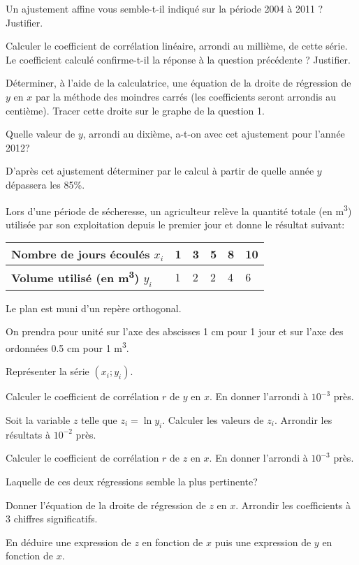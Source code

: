 \documentclass[a4paper,12pt]{scrartcl}
\begin{document}

\subquestion{}
Un ajustement affine vous semble-t-il indiqué sur la période 2004 à 2011 ? Justifier.

\subquestion{}
Calculer le coefficient de corrélation linéaire, arrondi au millième, de cette série.
Le coefficient calculé confirme-t-il la réponse à la question précédente ? Justifier.


Déterminer, à l’aide de la calculatrice, une équation de la droite de régression de $y$ en $x$ par la méthode des moindres carrés (les coefficients seront arrondis au centième). Tracer cette droite sur le graphe de la question 1. %

\question{}
Quelle valeur de $y$, arrondi au dixième, a-t-on avec cet ajustement pour l'année 2012?

\question{}
D'après cet ajustement déterminer par le calcul à partir de quelle année $y$ dépassera les 85\%.



Lors d'une période de sécheresse, un agriculteur relève la quantité totale (en m\textsuperscript{3}) utilisée par son exploitation depuis le premier jour et donne le résultat suivant:

\begin{center}
\begin{tabular}{|l|l|l|l|l|l|}
\hline
\textbf{Nombre de jours écoulés $x_i$} & 1 & 3 & 5 & 8 & 10\\ \hline
\textbf{Volume utilisé (en m\textsuperscript{3}) $y_i$} & 1 & 2 & 2 & 4 & 6 \\ \hline
\end{tabular}
\end{center}

Le plan est muni d'un repère orthogonal.

On prendra pour unité sur l'axe des abscisses 1 cm pour 1 jour et sur l'axe des ordonnées 0.5 cm pour 1 m\textsuperscript{3}.

\question{}
Représenter la série $(x_i;y_i)$.

\question{}
Calculer le coefficient de corrélation $r$ de $y$ en $x$. En donner l'arrondi à $10^{-3}$ près. 

\question{}
Soit la variable $z$ telle que $z_i = \ln y_i$. Calculer les valeurs de $z_i$. Arrondir les résultats à $10^{-2}$ près. 

\question{}
Calculer le coefficient de corrélation $r$ de $z$ en $x$. En donner l'arrondi à $10^{-3}$ près. 

Laquelle de ces deux régressions semble la plus pertinente?

\question{}
Donner l'équation de la droite de régression de $z$ en $x$. Arrondir les coefficients à 3 chiffres significatifs. 

\question{}
En déduire une expression de $z$ en fonction de $x$ puis une expression de $y$ en fonction de $x$.
\end{document}
